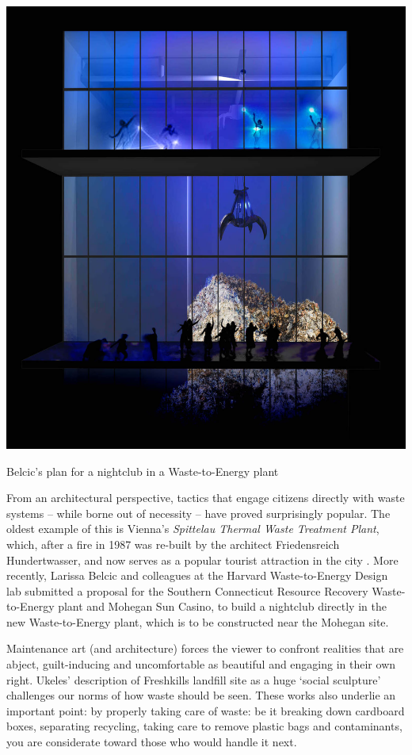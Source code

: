 \documentclass[nofonts,nols,justified,nobib]{tufte-book}
\begin{document}
\begin{marginfigure}
\includegraphics[width=\textwidth]{img/1/belcic-wasted.jpg}
\caption{Belcic's plan for a nightclub in a Waste-to-Energy plant}
\end{marginfigure}


From an architectural perspective, tactics that engage citizens directly with waste systems -- while borne out of necessity -- have proved surprisingly popular. The oldest example of this is Vienna's \emph{Spittelau Thermal Waste Treatment Plant}, which, after a fire in 1987 was re-built by the architect Friedensreich Hundertwasser, and now serves as a popular tourist attraction in the city \cite{noauthor_wien_nodate}. More recently, Larissa Belcic and colleagues at the Harvard Waste-to-Energy Design lab submitted a proposal for the Southern Connecticut Resource Recovery Waste-to-Energy plant and Mohegan Sun Casino, to build a nightclub directly in the new Waste-to-Energy plant, which is to be constructed near the Mohegan site. \cite{belcic_wasted_2015}

Maintenance art (and architecture) forces the viewer to confront realities that are abject, guilt-inducing and uncomfortable as beautiful and engaging in their own right. Ukeles' description of  Freshkills landfill site as a huge `social sculpture' challenges our norms of how waste should be seen\cite{cotter_artist_2017}. These works also underlie an important point: by properly taking care of waste: be it breaking down cardboard boxes, separating recycling, taking care to remove plastic bags and contaminants, you are considerate toward those who would handle it next.
\end{document}
